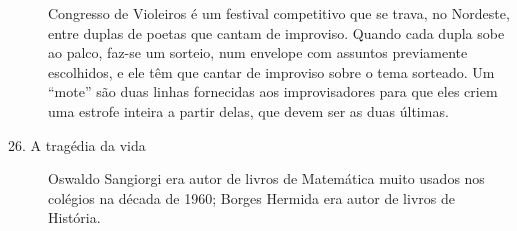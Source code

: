 \begin{description}
Congresso de Violeiros é um festival competitivo que se trava, no
Nordeste, entre duplas de poetas que cantam de improviso.  Quando
cada dupla sobe ao palco, faz-se um sorteio, num envelope com
assuntos previamente escolhidos, e ele têm que cantar de improviso
sobre o tema sorteado.  Um “mote” são duas linhas fornecidas aos
improvisadores para que eles criem uma estrofe inteira a partir
delas, que devem ser as duas últimas.

\item[26. A tragédia da vida]

Oswaldo Sangiorgi era autor de livros de Matemática muito usados nos
colégios na década de 1960; Borges Hermida era autor de livros de
História.

\end{description}

